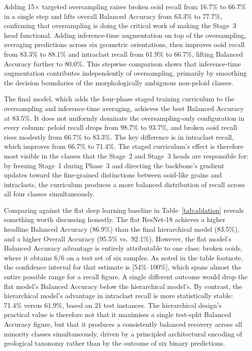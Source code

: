 \documentclass[a4paper,fleqn]{cas-dc}
\begin{document}
Adding 15$\times$ targeted oversampling raises broken ooid recall from 16.7\% to 66.7\% in a single step and lifts overall Balanced Accuracy from 63.3\% to 77.7\%, confirming that oversampling is doing the critical work of making the Stage~3 head functional. Adding inference-time augmentation on top of the oversampling, averaging predictions across six geometric orientations, then improves ooid recall from 83.3\% to 88.1\% and intraclast recall from 61.9\% to 66.7\%, lifting Balanced Accuracy further to 80.0\%. This stepwise comparison shows that inference-time augmentation contributes independently of oversampling, primarily by smoothing the decision boundaries of the morphologically ambiguous non-peloid classes.

The final model, which adds the four-phase staged training curriculum to the oversampling and inference-time averaging, achieves the best Balanced Accuracy at 83.5\%. It does not uniformly dominate the oversampling-only configuration in every column: peloid recall drops from 98.7\% to 93.7\%, and broken ooid recall rises modestly from 66.7\% to 83.3\%. The key difference is in intraclast recall, which improves from 66.7\% to 71.4\%. The staged curriculum's effect is therefore most visible in the classes that the Stage~2 and Stage~3 heads are responsible for: by freezing Stage~1 during Phase~3 and directing the backbone's gradient updates toward the fine-grained distinctions between ooid-like grains and intraclasts, the curriculum produces a more balanced distribution of recall across all four classes simultaneously.

Comparing against the flat deep learning baseline in Table~\ref{tab:ablation} reveals something worth discussing honestly. The flat ResNet-18 achieves a higher headline Balanced Accuracy (86.9\%) than the final hierarchical model (83.5\%), and a higher Overall Accuracy (95.5\% vs.\ 92.1\%). However, the flat model's Balanced Accuracy advantage is entirely attributable to one class: broken ooids, where it obtains 6/6 on a test set of six samples. As noted in the table footnote, the confidence interval for that estimate is [54\%--100\%], which spans almost the entire possible range for a recall figure. A single different outcome would drop the flat model's Balanced Accuracy below the hierarchical model's. By contrast, the hierarchical model's advantage in intraclast recall is more statistically stable: 71.4\% versus 61.9\%, based on 21 test instances. The hierarchical design's practical value is therefore not that it maximises a single test-split Balanced Accuracy figure, but that it produces a consistently balanced recovery across all minority classes simultaneously, driven by a principled architectural encoding of geological taxonomy rather than by the outcome of six binary predictions.
\end{document}
